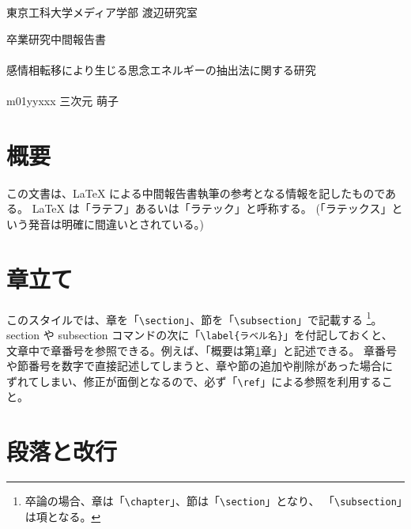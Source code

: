 \documentclass[12pt,a4paper,uplatex,dvipdfmx]{jsarticle}
\begin{document}
東京工科大学メディア学部 渡辺研究室\\
\begin{center}
{\LARGE 卒業研究中間報告書} \\ \mbox{} \\
{\Large 感情相転移により生じる思念エネルギーの抽出法に関する研究} \\ \mbox{} \\
{\large m01yyxxx 三次元 萌子}
\end{center}

\section{概要}
\label{sec:introduction}
この文書は、LaTeX による中間報告書執筆の参考となる情報を記したものである。
LaTeX は「ラテフ」あるいは「ラテック」と呼称する。
(「ラテックス」という発音は明確に間違いとされている。)

\section{章立て}
\label{sec:section}
このスタイルでは、章を「\verb+\section+」、節を「\verb+\subsection+」で記載する
\footnote{卒論の場合、章は「\verb+\chapter+」、節は「\verb+\section+」となり、
「\verb+\subsection+」は項となる。}。
section や subsection コマンドの次に「\verb+\label{ラベル名}+」を付記しておくと、
文章中で章番号を参照できる。例えば、「概要は第\ref{sec:introduction}章」と記述できる。
章番号や節番号を数字で直接記述してしまうと、章や節の追加や削除があった場合に
ずれてしまい、修正が面倒となるので、必ず「\verb+\ref+」による参照を利用すること。

\section{段落と改行}
\label{sec:paragraph}
\end{document}
